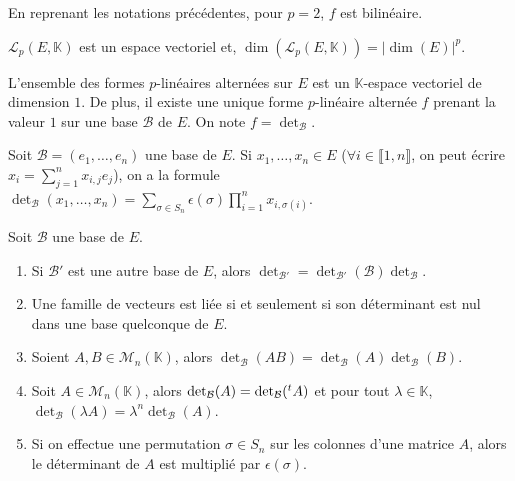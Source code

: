 	\begin{example}
		En reprenant les notations précédentes, pour $p = 2$, $f$ est bilinéaire.
	\end{example}

	\begin{proposition}
		$\mathcal{L}_p(E, \mathbb{K})$ est un espace vectoriel et, $\operatorname{dim}(\mathcal{L}_p(E, \mathbb{K})) = |\operatorname{dim}(E)|^p$.
	\end{proposition}

	\begin{theorem}
		L'ensemble des formes $p$-linéaires alternées sur $E$ est un $\mathbb{K}$-espace vectoriel de dimension $1$. De plus, il existe une unique forme $p$-linéaire alternée $f$ prenant la valeur $1$ sur une base $\mathcal{B}$ de $E$. On note $f = \det_{\mathcal{B}}$.
	\end{theorem}

	\begin{proposition}
		Soit $\mathcal{B} = (e_1, \dots, e_n)$ une base de $E$. Si $x_1, \dots, x_n \in E$ ($\forall i \in \llbracket 1, n \rrbracket$, on peut écrire $x_i = \sum_{j=1}^n x_{i,j} e_j$), on a la formule $\det_{\mathcal{B}}(x_1, \dots, x_n) = \sum_{\sigma \in S_n} \epsilon(\sigma) \prod_{i=1}^n x_{i,\sigma(i)}$.
	\end{proposition}

	\begin{corollary}
		Soit $\mathcal{B}$ une base de $E$.
		\begin{enumerate}[label=(\roman*)]
			\item Si $\mathcal{B}'$ est une autre base de $E$, alors $\det_{\mathcal{B}'} = \det_{\mathcal{B}'}(\mathcal{B}) \det_{\mathcal{B}}$.
			\item Une famille de vecteurs est liée si et seulement si son déterminant est nul dans une base quelconque de $E$.
			\item Soient $A, B \in \mathcal{M}_n(\mathbb{K})$, alors $\det_{\mathcal{B}}(AB) = \det_{\mathcal{B}}(A) \det_{\mathcal{B}}(B)$.
			\item Soit $A \in \mathcal{M}_n(\mathbb{K})$, alors $\det_{\mathcal{B}}(A) = \det_{\mathcal{B}}(\mathstrut ^t A)$ et pour tout $\lambda \in \mathbb{K}$, $\det_{\mathcal{B}}(\lambda A) = \lambda^n \det_{\mathcal{B}}(A)$.
			\item Si on effectue une permutation $\sigma \in S_n$ sur les colonnes d'une matrice $A$, alors le déterminant de $A$ est multiplié par $\epsilon(\sigma)$.
		\end{enumerate}
	\end{corollary}

